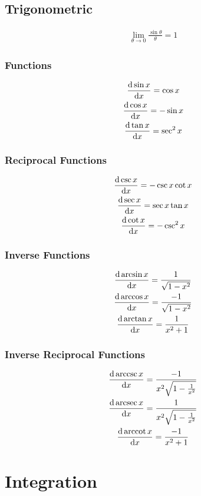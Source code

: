 \documentclass[12pt]{article}
\begin{document}
		\subsection{Trigonometric}
			\begin{gather}
				\lim_{\theta \to 0} \frac{\sin \theta}{\theta} =
				1
			\end{gather}
			\subsubsection{Functions}
				\begin{gather}
					\frac{\text{d} \sin x}{\text{d} x} = \cos x \\
					\frac{\text{d} \cos x}{\text{d} x} = -\sin x \\
					\frac{\text{d} \tan x}{\text{d} x} = \sec^2 x
				\end{gather}
			\subsubsection{Reciprocal Functions}
				\begin{gather}
					\frac{\text{d} \csc x}{\text{d} x} = -\csc x \cot x \\
					\frac{\text{d} \sec x}{\text{d} x} = \sec x \tan x \\
					\frac{\text{d} \cot x}{\text{d} x} = -\csc^2 x
				\end{gather}
			\subsubsection{Inverse Functions}
				\begin{gather}
					\frac{\text{d} \arcsin x}{\text{d} x} = \frac{1}{\sqrt{1 -
					x^2}} \\
					\frac{\text{d} \arccos x}{\text{d} x} = \frac{-1}{\sqrt{1 -
					x^2}}  \\
					\frac{\text{d} \arctan x}{\text{d} x} = \frac{1}{x^2 + 1}
				\end{gather}
			\subsubsection{Inverse Reciprocal Functions}
				\begin{gather}
					\frac{\text{d} \,\text{arccsc}\, x}{\text{d} x} = \frac{-1}{x^2\sqrt{1
					- \frac{1}{x^2}}} \\
					\frac{\text{d} \,\text{arcsec}\, x}{\text{d} x} = \frac{1}{x^2\sqrt{1
					- \frac{1}{x^2}}} \\
					\frac{\text{d} \,\text{arccot}\, x}{\text{d} x} = \frac{-1}{x^2 + 1}
				\end{gather}
	\section{Integration}
\end{document}
